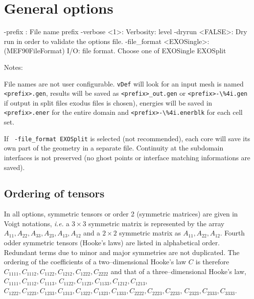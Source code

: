 \documentclass[10pt,oneside]{memoir}
\def\vDef{{\texttt{vDef}} }
\begin{document}
\section{General options}
\begin{boxedverbatim}
-prefix : File name prefix
-verbose <1>: Verbosity: level 
-dryrun <FALSE>: Dry run in order to validate the options file. 
-file_format <EXOSingle>: (MEF90FileFormat) I/O: file format. 
                          Choose one of EXOSingle EXOSplit
\end{boxedverbatim}
Notes: 
\begin{compactenum}
\item File names are not user configurable. \vDef will look for an input mesh is named \verb+<prefix>.gen+, results will be saved as \verb+<prefix>_out.gen+ or \verb+<prefix>-\%4i.gen+ if output in split files exodus files is chosen), energies will be saved in  \verb+<prefix>.ener+ for the entire domain and \verb+<prefix>-\%4i.enerblk+ for each cell set.
\item If \verb+ -file_format EXOSplit+ is selected (not recommended), each core will save its own part of the geometry in a separate file. Continuity at the subdomain interfaces is not preserved (no ghost points or interface matching informations are saved).
\end{compactenum}

\subsection{Ordering of tensors}
In all options, symmetric tensors or order 2 (symmetric matrices) are given in Voigt notations, \emph{i.e.} a $3\times 3$ symmetric matrix is represented by the array $A_{11},A_{22},A_{33},A_{23},A_{13},A_{12}$ and a $2\times 2$ symmetric matrix as $A_{11},A_{22},A_{12}$. Fourth odder symmetric tensors (Hooke's laws) are listed in alphabetical order. Redundant terms due to minor and major symmetries are not duplicated. The ordering of the coefficients of a two--dimensional Hooke's law $C$ is therefore $C_{1111}, C_{1112}, C_{1122}, C_{1212}, C_{1222}, C_{2222}$ and that of  a three--dimensional Hooke's law, $C_{1111}, C_{1112}, C_{1113}$, $C_{1122}, C_{1123}, C_{1133}, C_{1212}, C_{1213}$, $C_{1222}, C_{1223}, C_{1233}, C_{1313}, C_{1322}, C_{1323}, C_{1333}, C_{2222}, C_{2223}, C_{2233}$,
$C_{2323}, C_{2333}, C_{3333}$. 
\end{document}
